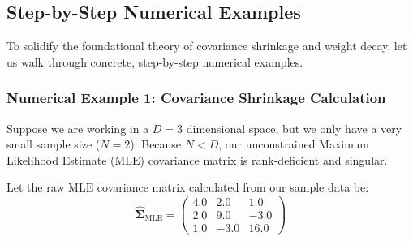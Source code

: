 \documentclass{article}
\begin{document}
\begin{table}[htbp]
\centering
\small
{}
\caption{Comparative Overview of MAP Regularization Frameworks}
\label{tab:regularization_comparison}
\end{table}

\subsection{Step-by-Step Numerical Examples}

To solidify the foundational theory of covariance shrinkage and weight decay, let us walk through concrete, step-by-step numerical examples.

\subsubsection{Numerical Example 1: Covariance Shrinkage Calculation}

Suppose we are working in a $D = 3$ dimensional space, but we only have a very small sample size ($N = 2$). Because $N < D$, our unconstrained Maximum Likelihood Estimate ($\text{MLE}$) covariance matrix is rank-deficient and singular. 

Let the raw $\text{MLE}$ covariance matrix calculated from our sample data be:
\begin{equation}
\hat{\boldsymbol{\Sigma}}_{\text{MLE}} = \begin{pmatrix} 4.0 & 2.0 & 1.0 \\ 2.0 & 9.0 & -3.0 \\ 1.0 & -3.0 & 16.0 \end{pmatrix}
\end{equation}
\end{document}
